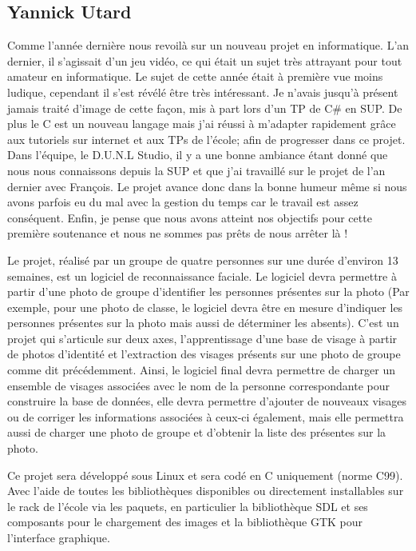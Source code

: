 \documentclass[12pt,a4paper]{article}
\begin{document}
\subsection{Yannick Utard}
Comme l'année dernière nous revoilà sur un nouveau projet en informatique. L'an dernier, il s'agissait d'un jeu vidéo, ce qui était un sujet très attrayant pour tout amateur en informatique. Le sujet de cette année était à première vue moins ludique, cependant il s'est révélé être très intéressant. Je n'avais jusqu'à présent jamais traité d'image de cette façon, mis à part lors d'un TP de C\# en SUP. De plus le C est un nouveau langage mais j'ai réussi à m'adapter rapidement grâce aux tutoriels sur internet et aux TPs de l'école; afin de progresser dans ce projet. 
Dans l'équipe, le D.U.N.L Studio, il y a une bonne ambiance étant donné que nous nous connaissons depuis la SUP et que j'ai travaillé sur le projet de l'an dernier avec François. Le projet avance donc dans la bonne humeur même si nous avons parfois eu du mal avec la gestion du temps car le travail est assez conséquent. Enfin, je pense que nous avons atteint nos objectifs pour cette première soutenance et nous ne sommes pas prêts de nous arrêter là !

\newpage
 
Le projet, réalisé par un groupe de quatre personnes sur une durée d'environ 13 semaines, est un logiciel de reconnaissance faciale. Le logiciel devra permettre à partir d'une photo de groupe d'identifier les personnes présentes sur la photo (Par exemple, pour une photo de classe, le logiciel devra être en mesure d'indiquer les personnes présentes sur la photo mais aussi de déterminer les absents). C'est un projet qui s'articule sur deux axes, l'apprentissage d'une base de visage à partir de photos d'identité et l'extraction des visages présents sur une photo de groupe comme dit précédemment. Ainsi, le logiciel final devra permettre de charger un ensemble de visages associées avec le nom de la personne correspondante pour construire la base de données, elle devra permettre d'ajouter de nouveaux visages ou de corriger les informations associées à ceux-ci également, mais elle permettra aussi de charger une photo de groupe et d'obtenir la liste des présentes sur la photo.

Ce projet sera développé sous Linux et sera codé en C uniquement (norme C99). Avec l'aide de toutes les bibliothèques disponibles ou directement installables sur le rack de l'école via les paquets, en particulier la bibliothèque SDL et ses composants pour le chargement des images et la bibliothèque GTK pour l'interface graphique. 
\end{document}
